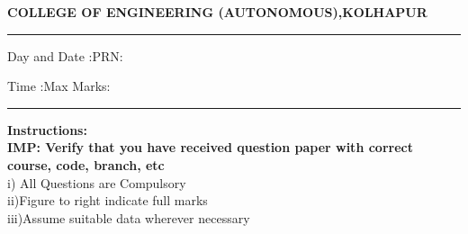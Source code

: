 \documentclass[12pt]{article}
\begin{document}
	\par
	{\bf{COLLEGE OF ENGINEERING (AUTONOMOUS),KOLHAPUR}}
	\par\noindent\rule{\textwidth}{0.4pt}
	
	\par
	\par
	\par
	\begin{flushleft}
		Day and Date :{}\hspace{5.5cm}PRN:
	\end{flushleft}
	
	\begin{flushleft}
		Time :{}\hspace{7cm}Max Marks:{\VAR{maxm}}\\
	\end{flushleft}
	\noindent\rule{\textwidth}{0.1pt}
\begin{flushleft}
	{\bf Instructions:}\\
	{\hspace{0.5cm} \bf IMP: Verify that you have received question paper with correct course, code, branch, etc}\\
	\hspace{1cm}i) All Questions are Compulsory\\
	\hspace{1cm}ii)Figure to right indicate full marks\\
	\hspace{1cm}iii)Assume suitable data wherever necessary\\
\end{flushleft}
\end{document}
